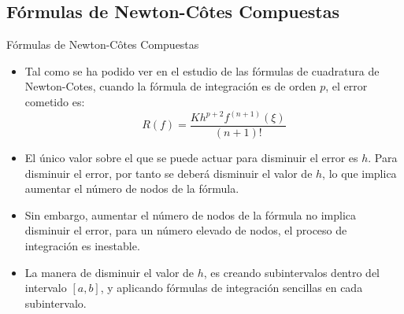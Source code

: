 \documentclass[12pt]{beamer}
\begin{document}
\subsection{F\'ormulas de Newton-C\^otes Compuestas}
\begin{frame}{F\'ormulas de Newton-C\^otes Compuestas}
  \begin{itemize}
    \item Tal como se ha podido ver en el estudio de las fórmulas de cuadratura de Newton-Cotes, cuando la fórmula
    de integración es de orden $p$, el error cometido es:
    $$
    R(f) = \dfrac{Kh^{p+2}f^{(n+1)}(\xi)}{(n+1)!}
    $$
    \item<2-> El único valor sobre el que se puede actuar para disminuir el error es $h$. Para disminuir el error, por tanto se
    deberá disminuir el valor de $h$, lo que implica aumentar el número de nodos de la fórmula.
    \item<3-> Sin embargo, aumentar el número de nodos de la fórmula no implica disminuir el error, para un número elevado de nodos, el proceso de integración es inestable.  
    \item<4-> La manera de disminuir el valor de $h$, es creando subintervalos dentro del intervalo $[a,b]$, y aplicando fórmulas de integración sencillas en cada subintervalo.
  \end{itemize}
\end{frame}
\end{document}
